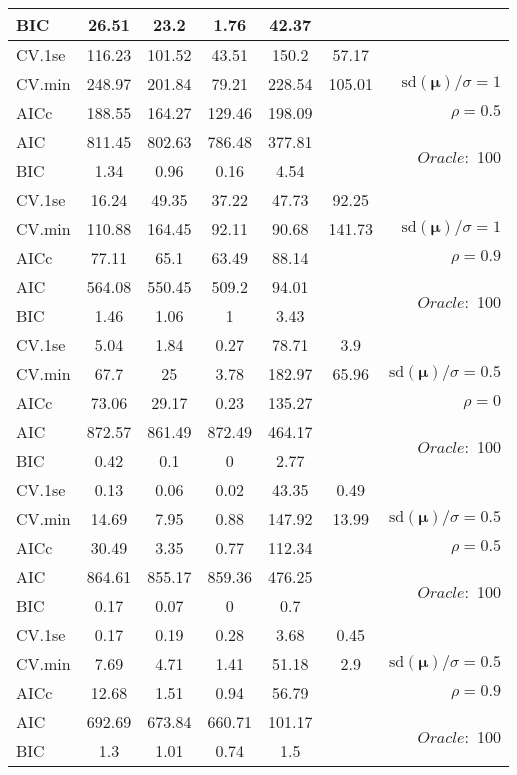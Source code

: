 \begin{table}
\begin{center}
\begin{tabular}{l*{5}{c}|r}
BIC & 26.51 & 23.2 & 1.76 & 42.37 & &  \\
 \hline 
CV.1se & 116.23 & 101.52 & 43.51 & 150.2 & 57.17 & \\
CV.min & 248.97 & 201.84 & 79.21 & 228.54 & 105.01 &  $\mathrm{sd}(\mathbf{\mu})/\sigma=1$ \\
AICc & 188.55 & 164.27 & 129.46 & 198.09 & & $\rho=0.5$ \\
AIC & 811.45 & 802.63 & 786.48 & 377.81 & &  \multirow{2}{*}{$Oracle: $ 100} \\
BIC & 1.34 & 0.96 & 0.16 & 4.54 & &  \\
 \hline 
CV.1se & 16.24 & 49.35 & 37.22 & 47.73 & 92.25 & \\
CV.min & 110.88 & 164.45 & 92.11 & 90.68 & 141.73 &  $\mathrm{sd}(\mathbf{\mu})/\sigma=1$ \\
AICc & 77.11 & 65.1 & 63.49 & 88.14 & & $\rho=0.9$ \\
AIC & 564.08 & 550.45 & 509.2 & 94.01 & &  \multirow{2}{*}{$Oracle: $ 100} \\
BIC & 1.46 & 1.06 & 1 & 3.43 & &  \\
 \hline 
CV.1se & 5.04 & 1.84 & 0.27 & 78.71 & 3.9 & \\
CV.min & 67.7 & 25 & 3.78 & 182.97 & 65.96 &  $\mathrm{sd}(\mathbf{\mu})/\sigma=0.5$ \\
AICc & 73.06 & 29.17 & 0.23 & 135.27 & & $\rho=0$ \\
AIC & 872.57 & 861.49 & 872.49 & 464.17 & &  \multirow{2}{*}{$Oracle: $ 100} \\
BIC & 0.42 & 0.1 & 0 & 2.77 & &  \\
 \hline 
CV.1se & 0.13 & 0.06 & 0.02 & 43.35 & 0.49 & \\
CV.min & 14.69 & 7.95 & 0.88 & 147.92 & 13.99 &  $\mathrm{sd}(\mathbf{\mu})/\sigma=0.5$ \\
AICc & 30.49 & 3.35 & 0.77 & 112.34 & & $\rho=0.5$ \\
AIC & 864.61 & 855.17 & 859.36 & 476.25 & &  \multirow{2}{*}{$Oracle: $ 100} \\
BIC & 0.17 & 0.07 & 0 & 0.7 & &  \\
 \hline 
CV.1se & 0.17 & 0.19 & 0.28 & 3.68 & 0.45 & \\
CV.min & 7.69 & 4.71 & 1.41 & 51.18 & 2.9 &  $\mathrm{sd}(\mathbf{\mu})/\sigma=0.5$ \\
AICc & 12.68 & 1.51 & 0.94 & 56.79 & & $\rho=0.9$ \\
AIC & 692.69 & 673.84 & 660.71 & 101.17 & &  \multirow{2}{*}{$Oracle: $ 100} \\
BIC & 1.3 & 1.01 & 0.74 & 1.5 & &  \\
 \hline 
\end{tabular}
\end{center}
\vspace{-1cm}
\end{table}




